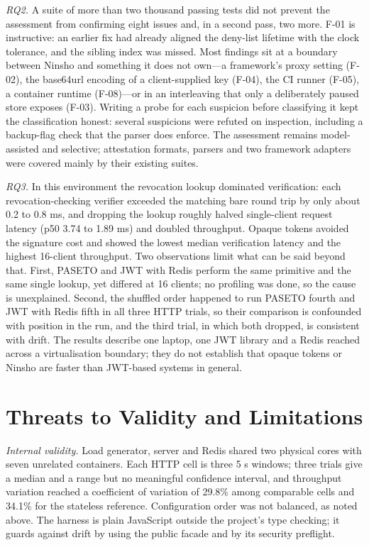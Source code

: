 \documentclass[conference]{IEEEtran}
\begin{document}
\emph{RQ2.} A suite of more than two thousand passing tests did not prevent the assessment from confirming eight issues and, in a second pass, two more. F-01 is instructive: an earlier fix had already aligned the deny-list lifetime with the clock tolerance, and the sibling index was missed. Most findings sit at a boundary between Ninsho and something it does not own---a framework's proxy setting (F-02), the base64url encoding of a client-supplied key (F-04), the CI runner (F-05), a container runtime (F-08)---or in an interleaving that only a deliberately paused store exposes (F-03). Writing a probe for each suspicion before classifying it kept the classification honest: several suspicions were refuted on inspection, including a backup-flag check that the parser does enforce. The assessment remains model-assisted and selective; attestation formats, parsers and two framework adapters were covered mainly by their existing suites.

\emph{RQ3.} In this environment the revocation lookup dominated verification: each revocation-checking verifier exceeded the matching bare round trip by only about 0.2 to 0.8 ms, and dropping the lookup roughly halved single-client request latency (p50 3.74 to 1.89 ms) and doubled throughput. Opaque tokens avoided the signature cost and showed the lowest median verification latency and the highest 16-client throughput. Two observations limit what can be said beyond that. First, PASETO and JWT with Redis perform the same primitive and the same single lookup, yet differed at 16 clients; no profiling was done, so the cause is unexplained. Second, the shuffled order happened to run PASETO fourth and JWT with Redis fifth in all three HTTP trials, so their comparison is confounded with position in the run, and the third trial, in which both dropped, is consistent with drift. The results describe one laptop, one JWT library and a Redis reached across a virtualisation boundary; they do not establish that opaque tokens or Ninsho are faster than JWT-based systems in general.

\section{Threats to Validity and Limitations}
\label{sec:threats}

\emph{Internal validity.} Load generator, server and Redis shared two physical cores with seven unrelated containers. Each HTTP cell is three 5 s windows; three trials give a median and a range but no meaningful confidence interval, and throughput variation reached a coefficient of variation of 29.8\% among comparable cells and 34.1\% for the stateless reference. Configuration order was not balanced, as noted above. The harness is plain JavaScript outside the project's type checking; it guards against drift by using the public facade and by its security preflight.
\end{document}
